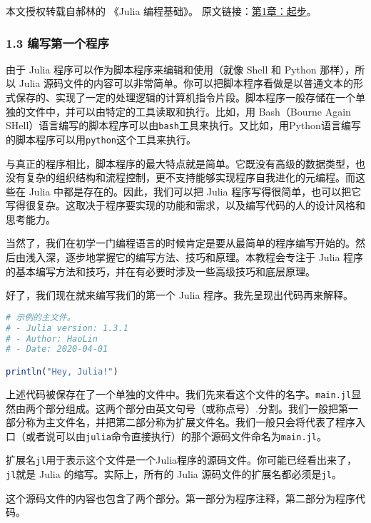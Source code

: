 
本文授权转载自郝林的 《Julia 编程基础》。 原文链接：\href{https://github.com/hyper0x/JuliaBasics/blob/master/book/ch01.md}{第1章：起步}。


\subsubsection{1.3 编写第一个程序}

由于 Julia 程序可以作为脚本程序来编辑和使用（就像 Shell 和 Python 那样），所以 Julia 源码文件的内容可以非常简单。你可以把脚本程序看做是以普通文本的形式保存的、实现了一定的处理逻辑的计算机指令片段。脚本程序一般存储在一个单独的文件中，并可以由特定的工具读取和执行。比如，用 Bash（Bourne Again SHell）语言编写的脚本程序可以由\verb`bash`工具来执行。又比如，用Python语言编写的脚本程序可以用\verb`python`这个工具来执行。

与真正的程序相比，脚本程序的最大特点就是简单。它既没有高级的数据类型，也没有复杂的组织结构和流程控制，更不支持能够实现程序自我进化的元编程。而这些在 Julia 中都是存在的。因此，我们可以把 Julia 程序写得很简单，也可以把它写得很复杂。这取决于程序要实现的功能和需求，以及编写代码的人的设计风格和思考能力。

当然了，我们在初学一门编程语言的时候肯定是要从最简单的程序编写开始的。然后由浅入深，逐步地掌握它的编写方法、技巧和原理。本教程会专注于 Julia 程序的基本编写方法和技巧，并在有必要时涉及一些高级技巧和底层原理。

好了，我们现在就来编写我们的第一个 Julia 程序。我先呈现出代码再来解释。

\begin{lstlisting}[language=julia]
# 示例的主文件。
# - Julia version: 1.3.1
# - Author: HaoLin
# - Date: 2020-04-01

println("Hey, Julia!")
\end{lstlisting}

上述代码被保存在了一个单独的文件中。我们先来看这个文件的名字。\verb`main.jl`显然由两个部分组成。这两个部分由英文句号（或称点号）.分割。我们一般把第一部分称为主文件名，并把第二部分称为扩展文件名。我们一般只会将代表了程序入口（或者说可以由\verb`julia`命令直接执行）的那个源码文件命名为\verb`main.jl`。

扩展名\verb`jl`用于表示这个文件是一个Julia程序的源码文件。你可能已经看出来了，\verb`jl`就是 Julia 的缩写。实际上，所有的 Julia 源码文件的扩展名都必须是\verb`jl`。

这个源码文件的内容也包含了两个部分。第一部分为程序注释，第二部分为程序代码。

